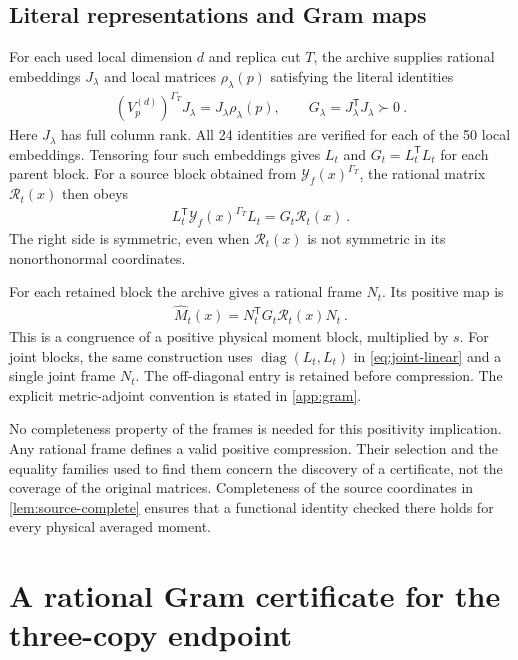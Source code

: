 \documentclass[aps,pra,reprint,superscriptaddress,amsmath,amssymb,floatfix,nofootinbib]{revtex4-2}
\begin{document}
\subsection{Literal representations and Gram maps}

For each used local dimension $d$ and replica cut $T$, the archive supplies
rational embeddings $J_\lambda$ and local matrices $\rho_\lambda(p)$
satisfying the literal identities
\begin{align}
 (V_p^{(d)})^{\Gamma_T}J_\lambda
   =J_\lambda\rho_\lambda(p),
 \qquad G_\lambda=J_\lambda^{\mathsf T}J_\lambda\succ0\ .
 \label{eq:local-intertwiner}
\end{align}
Here $J_\lambda$ has full column rank.
All 24 identities are verified for each of the 50 local embeddings.
Tensoring four such embeddings gives $L_t$ and
$G_t=L_t^{\mathsf T}L_t$ for each parent block.
For a source block obtained from $\mathcal Y_f(x)^{\Gamma_T}$,
the rational matrix $\mathscr R_t(x)$ then obeys
\begin{align}
 L_t^{\mathsf T}\mathcal Y_f(x)^{\Gamma_T}L_t
   =G_t\mathscr R_t(x)\ .
 \label{eq:literal-compression}
\end{align}
The right side is symmetric, even when $\mathscr R_t(x)$ is not
symmetric in its nonorthonormal coordinates.

For each retained block the archive gives a rational frame $N_t$.
Its positive map is
\begin{align}
 \widehat M_t(x)=N_t^{\mathsf T}G_t\mathscr R_t(x)N_t\ .
 \label{eq:compressed-map}
\end{align}
This is a congruence of a positive physical moment block, multiplied by
$s$. For joint blocks, the same construction uses
$\operatorname{diag}(L_t,L_t)$ in \cref{eq:joint-linear} and a single
joint frame $N_t$. The off-diagonal entry is retained before compression.
The explicit metric-adjoint convention is stated in \cref{app:gram}.

No completeness property of the frames is needed for this positivity
implication. Any rational frame defines a valid positive compression.
Their selection and the equality families used to find them concern the
discovery of a certificate, not the coverage of the original matrices.
Completeness of the source coordinates in \cref{lem:source-complete}
ensures that a functional identity checked there holds for every
physical averaged moment.

\section{A rational Gram certificate for the three-copy endpoint}
\label{sec:certificate}
\end{document}
